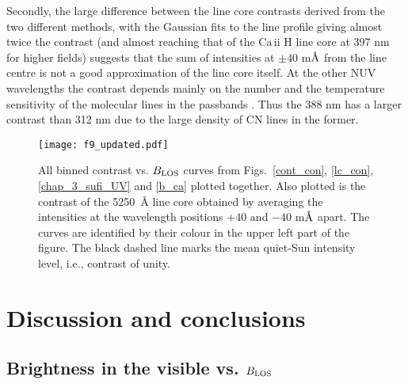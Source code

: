 \documentclass[goettingen, gauss, print]{thesis}
\begin{document}
Secondly, the large difference between the line core contrasts derived from the two different methods, with the Gaussian fits to the line profile giving almost twice the contrast (and almost reaching that of the Ca\,{\sc ii} H line core at 397 nm for higher fields) suggests that the sum of intensities at $\pm 40$ m${\textup{\AA}}$ from the line centre is not a good approximation of the line core itself. At the other NUV wavelengths the contrast depends mainly on the number and the temperature sensitivity of the molecular lines in the passbands \citep[see][]{schussler_why_2003}. Thus the 388 nm has a larger contrast than 312 nm due to the large density of CN lines in the former. 

\begin{landscape}
\begin{figure*}
\centering
\texttt{[image: f9\_updated.pdf]}
\caption{ All binned contrast vs. $B_{\rm LOS}$ curves from Figs.~\ref{cont_con}, \ref{lc_con}, \ref{chap_3_sufi_UV} and \ref{b_ca} plotted together. Also plotted is the contrast of the 5250\, \AA{} line core obtained by averaging the intensities at the wavelength positions $+40$ and $-40$ m${\textup{\AA}}$ apart. The curves are identified by their colour in the upper left part of the figure. The black dashed line marks the mean quiet-Sun intensity level, i.e., contrast of unity.}
\label{bins}
\end{figure*}
\end{landscape}

\section{Discussion and conclusions}
\label{chapter3_conc}
\subsection{Brightness in the visible vs. $B_{\rm LOS}$}
\end{document}
